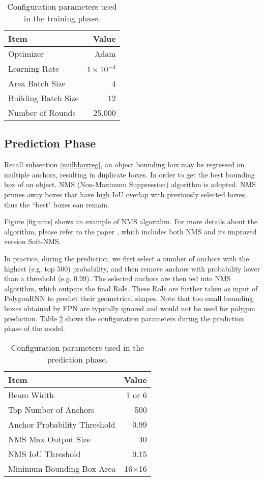\begin{table}[!h]
	\centering
	\caption[Configuration parameters used in the training phase]{Configuration parameters used in the training phase.}
	\label{tab:trnphs}
	\begin{tabular}{l|r}
	\hline
	\textbf{Item} & \textbf{Value} \\
	\hline
	Optimizer & Adam \\
	Learning Rate & $1\times10^{-4}$ \\
	Area Batch Size & 4 \\
	Building Batch Size & 12 \\
	Number of Rounds & 25,000 \\
	\hline
	\end{tabular}
\end{table}

\subsection{Prediction Phase}\label{prdphs}
Recall subsection \ref{mulbboxreg}, an object bounding box may be regressed on multiple anchors, resulting in duplicate boxes. In order to get the best bounding box of an object, NMS (Non-Maximum Suppression) algorithm is adopted. NMS prunes away boxes that have high IoU overlap with previously selected boxes, thus the ``best" boxes can remain.



Figure \ref{fig:nms} shows an example of NMS algorithm. For more details about the algorithm, please refer to the paper \cite{softnms}, which includes both NMS and its improved version Soft-NMS.

In practice, during the prediction, we first select a number of anchors with the highest (e.g. top 500) probability, and then remove anchors with probability lower than a threshold (e.g. 0.99). The selected anchors are then fed into NMS algorithm, which outputs the final RoIs. These RoIs are further taken as input of PolygonRNN to predict their geometrical shapes. Note that too small bounding boxes obtained by FPN are typically ignored and would not be used for polygon prediction. Table \ref{tab:prdphs} shows the configuration parameters during the prediction phase of the model.
\begin{table}[!h]
	\centering
	\caption[Configuration parameters used in the prediction phase]{Configuration parameters used in the prediction phase.}
	\label{tab:prdphs}
	\begin{tabular}{l|r}
	\hline
	\textbf{Item} & \textbf{Value} \\
	\hline
	Beam Width & 1 or 6 \\
	Top Number of Anchors & 500 \\
	Anchor Probability Threshold & 0.99 \\
	NMS Max Output Size & 40 \\
	NMS IoU Threshold & 0.15 \\
	Minimum Bounding Box Area & 16$\times$16 \\
	\hline
	\end{tabular}
\end{table}

